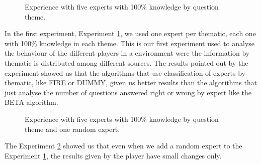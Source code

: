 \documentclass{llncs}
\begin{document}
\begin{figure}
\centering
{}
\caption{Experience with five experts with 100\% knowledge by question theme.}
\label{allexperts}
\end{figure}

In the first experiment, Experiment \ref{allexperts}, we used one expert per thematic, each one with 100\% knowledge in each theme. This is our first experiment used to analyse the behaviour of the different players in a environment were the information by thematic is distributed among different sources. The results pointed out by the experiment showed us that the algorithms that use classification of experts by thematic, like FIRE or DUMMY, given us better results than the algorithms that just analyse the number of questions answered right or wrong by expert like the BETA algorithm.

\begin{figure}
\centering
{}
\caption{Experience with five experts with 100\% knowledge by question theme and one random expert.}
\label{allexpertsrandom}
\end{figure}

The Experiment \ref{allexpertsrandom} showed us that even when we add a random expert to the Experiment \ref{allexperts}, the results given by the player have small changes only.
\end{document}
